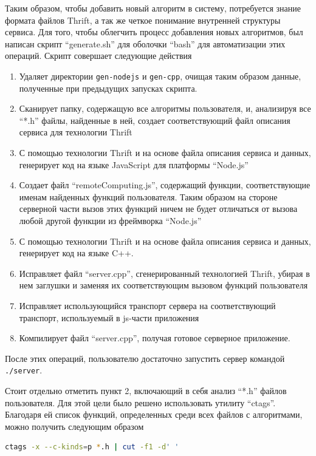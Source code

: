 \documentclass[12pt, a4paper]{article}
\begin{document}
Таким образом, чтобы добавить новый алгоритм в систему, потребуется знание
формата файлов Thrift, а так же четкое понимание внутренней структуры сервиса.
Для того, чтобы облегчить процесс добавления новых алгоритмов, был написан
скрипт ``generate.sh'' для оболочки ``bash'' для автоматизации этих операций.
Скрипт совершает следующие действия
\begin{enumerate}
    \item Удаляет директории \texttt{gen-nodejs} и \texttt{gen-cpp}, очищая
    таким образом данные, полученные при предыдущих запусках скрипта.
    \item Сканирует папку, содержащую все алгоритмы пользователя, и, анализируя
    все ``*.h'' файлы, найденные в ней, создает соответствующий файл описания
    сервиса для технологии Thrift
    \item С помощью технологии Thrift и на основе файла описания сервиса и
    данных, генерирует код на языке JavaScript для платформы ``Node.js''
    \item Создает файл ``remoteComputing.js'', содержащий функции,
    соответствующие именам найденных функций пользователя. Таким образом на
    стороне серверной части вызов этих функций ничем не будет отличаться
    от вызова любой другой функции из фреймворка ``Node.js''
    \item С помощью технологии Thrift и на основе файла описания сервиса и
    данных, генерирует код на языке C++.
    \item Исправляет файл ``server.cpp'', сгенерированный технологией Thrift,
    убирая в нем заглушки и заменяя их соответствующим вызовом функций
    пользователя
    \item Исправляет использующийся транспорт сервера на соответствующий
    транспорт, используемый в js-части приложения
    \item Компилирует файл ``server.cpp'', получая готовое серверное приложение.
\end{enumerate}

После этих операций, пользователю достаточно запустить сервер командой
\texttt{./server}.

Стоит отдельно отметить пункт 2, включающий в себя анализ ``*.h'' файлов
пользователя. Для этой цели было решено использовать утилиту ``ctags''.
Благодаря ей список функций, определенных среди всех файлов с алгоритмами, можно
получить следующим образом
\begin{lstlisting}[language=bash]
    ctags -x --c-kinds=p *.h | cut -f1 -d' '
\end{lstlisting}
\end{document}
